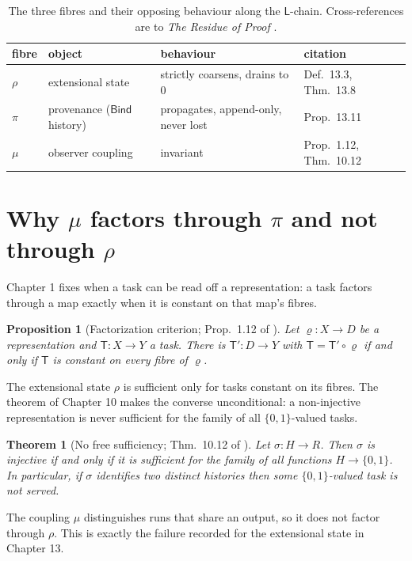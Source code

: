 \documentclass[10pt,a4paper]{article}
\theoremstyle{plain}
\newtheorem{theorem}{Theorem}
\newtheorem{proposition}{Proposition}
\theoremstyle{definition}
\theoremstyle{remark}
\newcommand{\Rho}{\rho}
\newcommand{\Pii}{\pi}
\newcommand{\Mu}{\mu}
\begin{document}
\begin{table}[h]
\centering
\begin{tabular}{@{}llll@{}}
\toprule
fibre & object & behaviour & citation \\
\midrule
$\Rho$ & extensional state & strictly coarsens, drains to $0$ & Def.~13.3, Thm.~13.8 \\
$\Pii$ & provenance ($\mathsf{Bind}$ history) & propagates, append-only, never lost & Prop.~13.11 \\
$\Mu$ & observer coupling & invariant & Prop.~1.12, Thm.~10.12 \\
\bottomrule
\end{tabular}
\caption{The three fibres and their opposing behaviour along the $\mathsf{L}$-chain.
Cross-references are to \emph{The Residue of Proof} \cite{residue}.}
\end{table}

\section{Why $\Mu$ factors through $\Pii$ and not through $\Rho$}

Chapter 1 fixes when a task can be read off a representation: a task factors
through a map exactly when it is constant on that map's fibres.

\begin{proposition}[Factorization criterion; Prop.~1.12 of \cite{residue}]
\label{prop:factor}
Let $\varrho : X \to D$ be a representation and $\mathsf{T} : X \to Y$ a task.
There is $\mathsf{T}' : D \to Y$ with $\mathsf{T} = \mathsf{T}' \circ \varrho$
if and only if $\mathsf{T}$ is constant on every fibre of $\varrho$.
\end{proposition}

The extensional state $\Rho$ is sufficient only for tasks constant on its
fibres. The theorem of Chapter 10 makes the converse unconditional: a
non-injective representation is never sufficient for the family of all
$\{0,1\}$-valued tasks.

\begin{theorem}[No free sufficiency; Thm.~10.12 of \cite{residue}]
\label{thm:nofree}
Let $\sigma : H \to R$. Then $\sigma$ is injective if and only if it is
sufficient for the family of all functions $H \to \{0,1\}$. In particular, if
$\sigma$ identifies two distinct histories then some $\{0,1\}$-valued task is
not served.
\end{theorem}

The coupling $\Mu$ distinguishes runs that share an output, so it does not
factor through $\Rho$. This is exactly the failure recorded for the extensional
state in Chapter 13.
\end{document}
